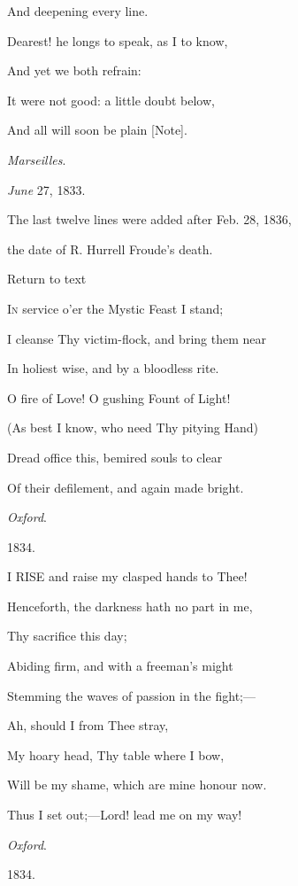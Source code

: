 And deepening every line.

Dearest! he longs to speak, as I to know,

And yet we both refrain:

It were not good: a little doubt below,

And all will soon be plain [Note].

\emph{Marseilles}.

\emph{June} 27, 1833.


The last twelve lines were added after Feb. 28, 1836,

the date
of
R. Hurrell Froude's death.

Return to text


I\textsc{n} service o'er the Mystic Feast I stand;

I cleanse Thy victim-flock, and bring
them near

In
holiest wise, and by a bloodless rite.

O fire
of Love! O gushing Fount of Light!

(As best I know, who need Thy pitying Hand)

Dread office this, bemired souls to
clear

Of
their defilement, and again made bright.

\emph{Oxford}.

1834.


I RISE and raise my clasped hands to Thee!

Henceforth, the darkness hath no part in me,

Thy
sacrifice this day;

Abiding firm, and with a freeman's might

Stemming the waves of passion in the fight;—

Ah,
should I from Thee stray,

My hoary head, Thy table where I bow,

Will be my shame, which are mine honour now.

Thus I set out;—Lord! lead me on my way!

\emph{Oxford}.

1834.


